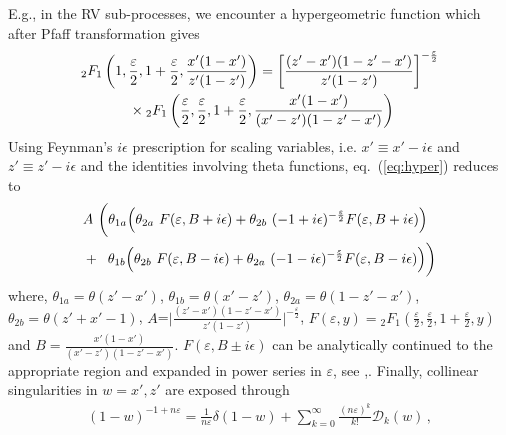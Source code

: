 \documentclass[%
 twocolumn,
 superscriptaddress,
 preprintnumbers,
 nofootinbib,
 amsmath,amssymb,
 aps,
 prl,
]{revtex4}
\begin{document}
{E.g., in the RV sub-processes, we encounter a hypergeometric function which after Pfaff transformation gives 
%
\begin{align}\label{eq:hyper}
&{}_{2}F_{1}\left(1,\frac{\varepsilon}{2},1+\frac{\varepsilon}{2},\frac{x'(1-x')}{z'(1-z')}\right) 
   = \bigg[\frac{(z'-x')(1-z'-x')}{z'(1-z')}\bigg]^{-\frac{\varepsilon}{2}} \nonumber \\
   & \hspace{1.2cm}\times {}_{2}F_{1}\left(\frac{\varepsilon}{2},\frac{\varepsilon}{2},1+\frac{\varepsilon}{2},\frac{x'(1-x')}{(x'-z')(1-z'-x')}\right)
\end{align}
%
Using   Feynman's $i\epsilon$ prescription for scaling variables, i.e. $x'\equiv x'-i\epsilon$ and $z'\equiv z'-i\epsilon$ and the identities involving theta functions, eq.~(\ref{eq:hyper}) reduces to
%
\begin{align}
&A~\bigg(\theta_{1a}\Big(\theta_{2a}\ F(\varepsilon,B+i\epsilon)+\theta_{2b}\ (-1+i\epsilon)^{-\frac{\varepsilon}{2}}F(\varepsilon,B+i\epsilon)  \Big)\nonumber\\
&+\hspace{0.2cm}\theta_{1b}\Big(\theta_{2b}\ F(\varepsilon,B -i\epsilon)+\theta_{2a}\ (-1-i\epsilon)^{-\frac{\varepsilon}{2}}
F(\varepsilon,B-i\epsilon)  \Big)\bigg)\nonumber
\end{align}
%
where, $\theta_{1a} = \theta(z'-x')$, $\theta_{1b} = \theta(x'-z')$, $\theta_{2a} = \theta(1-z'-x')$, $\theta_{2b} = \theta(z'+x'-1)$, $A$=$\Big|\frac{(z'-x')(1-z'-x')}{z'(1-z')}\Big|^{-\frac{\varepsilon}{2}}$, $ F(\varepsilon,y)= {}_{2}F_{1}(\frac{\varepsilon}{2}, \frac{\varepsilon}{2},1+\frac{\varepsilon}{2},y)$ and $B = \frac{x'(1-x')}{(x'-z')(1-z'-x')}$.
%
$F(\varepsilon,B\pm i\epsilon)$ can be analytically continued to the appropriate region and expanded in power series in $\varepsilon$, see \cite{Duplancic:2000sk},\cite{Gehrmann:2002zr}. Finally, collinear singularities in $w=x',z'$ are exposed through 
%
\begin{align}
(1-w)^{-1 + n \varepsilon} = \frac{1}{n \varepsilon} \delta(1-w) + \sum_{k=0}^\infty \frac{(n \varepsilon)^k}{k!}  \mathcal{D}_{k}(w) \,,
\end{align}
%

}
\end{document}
